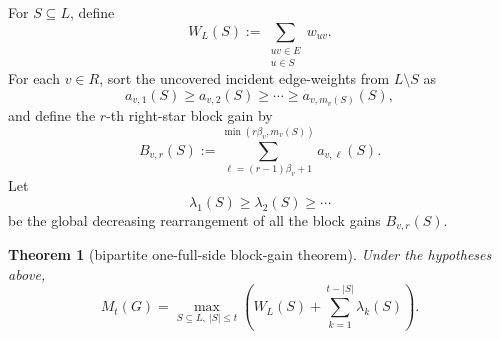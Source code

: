 \documentclass[11pt]{article}
\newtheorem{theorem}{Theorem}[section]
\theoremstyle{definition}
\begin{document}
For \(S\subseteq L\), define
\[
W_L(S):=\sum_{\substack{uv\in E\\ u\in S}} w_{uv}.
\]
For each \(v\in R\), sort the uncovered incident edge-weights from \(L\setminus S\) as
\[
a_{v,1}(S)\ge a_{v,2}(S)\ge \cdots \ge a_{v,m_v(S)}(S),
\]
and define the \(r\)-th right-star block gain by
\[
B_{v,r}(S):=
\sum_{\ell=(r-1)\beta_v+1}^{\min(r\beta_v,m_v(S))} a_{v,\ell}(S).
\]
Let
\[
\lambda_1(S)\ge \lambda_2(S)\ge \cdots
\]
be the global decreasing rearrangement of all the block gains \(B_{v,r}(S)\).

\begin{theorem}[bipartite one-full-side block-gain theorem]\label{thm:block-gain}
Under the hypotheses above,
\[
M_t(G)=
\max_{S\subseteq L,\ |S|\le t}
\left(
W_L(S)+\sum_{k=1}^{t-|S|}\lambda_k(S)
\right).
\]
\end{theorem}
\end{document}
